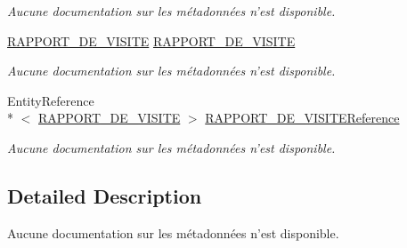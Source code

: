 \begin{DoxyCompactItemize}
\begin{DoxyCompactList}\small\item\em Aucune documentation sur les métadonnées n'est disponible. \end{DoxyCompactList}\item 
\hyperlink{class_model_1_1_r_a_p_p_o_r_t___d_e___v_i_s_i_t_e}{R\-A\-P\-P\-O\-R\-T\-\_\-\-D\-E\-\_\-\-V\-I\-S\-I\-T\-E} \hyperlink{class_model_1_1_p_r_e_s_e_n_t_e_a5a184babcb6553b484a45278f48ce515}{R\-A\-P\-P\-O\-R\-T\-\_\-\-D\-E\-\_\-\-V\-I\-S\-I\-T\-E}
\begin{DoxyCompactList}\small\item\em Aucune documentation sur les métadonnées n'est disponible. \end{DoxyCompactList}\item 
Entity\-Reference\\*
$<$ \hyperlink{class_model_1_1_r_a_p_p_o_r_t___d_e___v_i_s_i_t_e}{R\-A\-P\-P\-O\-R\-T\-\_\-\-D\-E\-\_\-\-V\-I\-S\-I\-T\-E} $>$ \hyperlink{class_model_1_1_p_r_e_s_e_n_t_e_afa6f45a1ed7ceb1f343ddcdbe55305cb}{R\-A\-P\-P\-O\-R\-T\-\_\-\-D\-E\-\_\-\-V\-I\-S\-I\-T\-E\-Reference}
\begin{DoxyCompactList}\small\item\em Aucune documentation sur les métadonnées n'est disponible. \end{DoxyCompactList}\end{DoxyCompactItemize}


\subsection{Detailed Description}
Aucune documentation sur les métadonnées n'est disponible. 



